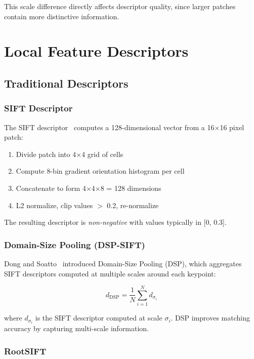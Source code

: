 This scale difference directly affects descriptor quality, since larger patches contain more distinctive information.

\section{Local Feature Descriptors}

\subsection{Traditional Descriptors}

\subsubsection{SIFT Descriptor}

The SIFT descriptor~\cite{lowe2004distinctive} computes a 128-dimensional vector from a 16$\times$16 pixel patch:

\begin{enumerate}
    \item Divide patch into 4$\times$4 grid of cells
    \item Compute 8-bin gradient orientation histogram per cell
    \item Concatenate to form 4$\times$4$\times$8 = 128 dimensions
    \item L2 normalize, clip values $>$ 0.2, re-normalize
\end{enumerate}

The resulting descriptor is \textit{non-negative} with values typically in [0, 0.3].

\subsubsection{Domain-Size Pooling (DSP-SIFT)}

Dong and Soatto~\cite{dong2015domain} introduced Domain-Size Pooling (DSP), which aggregates SIFT descriptors computed at multiple scales around each keypoint:

\begin{equation}
    d_{\text{DSP}} = \frac{1}{N} \sum_{i=1}^{N} d_{\sigma_i}
\end{equation}

where $d_{\sigma_i}$ is the SIFT descriptor computed at scale $\sigma_i$. DSP improves matching accuracy by capturing multi-scale information.

\subsubsection{RootSIFT}

